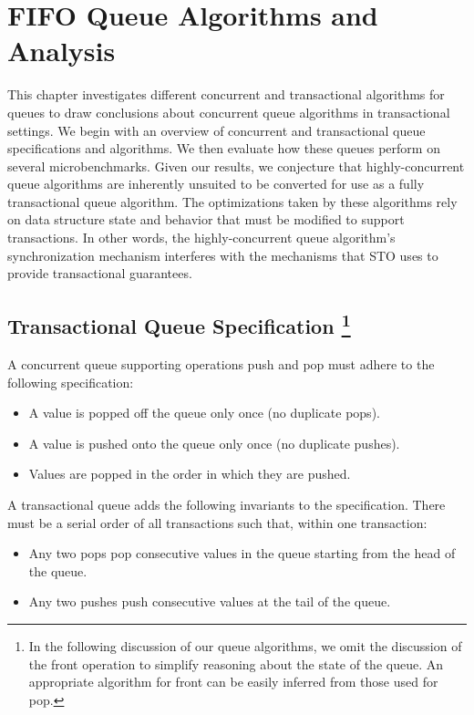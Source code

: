 \chapter{FIFO Queue Algorithms and Analysis}
\label{queue}

This chapter investigates different concurrent and transactional algorithms for queues to draw conclusions about concurrent queue algorithms in transactional settings. We begin with an overview of concurrent and transactional queue specifications and algorithms. We then evaluate how these queues perform on several microbenchmarks. Given our results, we conjecture that highly-concurrent queue algorithms are inherently unsuited to be converted for use as a fully transactional queue algorithm. The optimizations taken by these algorithms rely on data structure state and behavior that must be modified to support transactions. In other words, the highly-concurrent queue algorithm's synchronization mechanism interferes with the mechanisms that STO uses to provide transactional guarantees.

\section[Transactional Queue Specification]{Transactional Queue Specification
\footnote{In the following discussion of our queue algorithms, we omit the discussion of the front operation to simplify reasoning about the state of the queue. An appropriate algorithm for front can be easily inferred from those used for pop.}}

A concurrent queue supporting operations push and pop must adhere to the following specification:
\begin{itemize}
    \item A value is popped off the queue only once (no duplicate pops).
    \item A value is pushed onto the queue only once (no duplicate pushes).
    \item Values are popped in the order in which they are pushed.
\end{itemize}

\noindent
A transactional queue adds the following invariants to the specification. There must be a serial order of all transactions such that, within one transaction:
\begin{itemize}
    \item Any two pops pop consecutive values in the queue starting from the head of the queue.
    \item Any two pushes push consecutive values at the tail of the queue.
\end{itemize}

